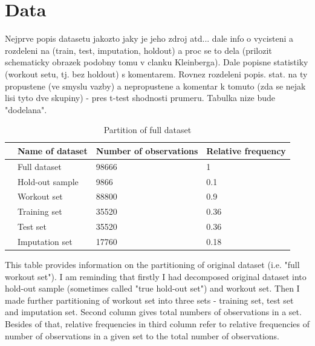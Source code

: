 \documentclass[12pt, twoside]{book} %
\begin{document}
\section{Data}     %

Nejprve popis datasetu jakozto jaky je jeho zdroj atd... dale info o vycisteni a  rozdeleni na (train, test, imputation, holdout) a proc se to dela (prilozit schematicky obrazek podobny tomu v clanku Kleinberga). Dale popisne statistiky (workout setu, tj. bez holdout) s komentarem. Rovnez rozdeleni popis. stat. na ty propustene (ve smyslu vazby) a nepropustene a komentar k tomuto (zda se nejak lisi tyto dve skupiny) -  pres t-test shodnosti prumeru. Tabulka nize bude "dodelana". 

\begin{table}[ht]
\centering
\begin{tabular}{rlll}
  \hline
 & Name of dataset & Number of observations & Relative frequency \\ 
  \hline
 & Full dataset & 98666 & 1 \\ 
  & Hold-out sample & 9866 & 0.1 \\ 
   & Workout set & 88800 & 0.9 \\ 
   & 	\hspace{1cm}Training set & 35520 & 0.36 \\ 
  & 	\hspace{1cm}Test set & 35520 & 0.36 \\ 
   &	\hspace{1cm}Imputation set & 17760 & 0.18 \\ 
   \hline
\end{tabular}

\caption{Partition of full dataset}
\medskip
{\small This table provides information on the partitioning of original dataset (i.e. "full workout set"). I am reminding that firstly I had decomposed original dataset into hold-out sample (sometimes called "true hold-out set") and workout set. Then I made further partitioning of workout set into three sets - training set, test set and imputation set. Second column gives total numbers of observations in a set. Besides of that, relative frequencies in third column refer to relative frequencies of number of observations in a given set to the total number of observations. }

\end{table}
\end{document}
